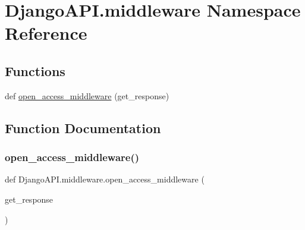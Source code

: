 \hypertarget{namespace_django_a_p_i_1_1middleware}{}\section{Django\+A\+P\+I.\+middleware Namespace Reference}
\label{namespace_django_a_p_i_1_1middleware}
\subsection*{Functions}
\begin{DoxyCompactItemize}
\item 
def \hyperlink{namespace_django_a_p_i_1_1middleware_a44c47dac28727c7fe143340eca4b4b85}{open\+\_\+access\+\_\+middleware} (get\+\_\+response)
\end{DoxyCompactItemize}


\subsection{Function Documentation}
\mbox{\label{namespace_django_a_p_i_1_1middleware_a44c47dac28727c7fe143340eca4b4b85}} 
\subsubsection{\texorpdfstring{open\+\_\+access\+\_\+middleware()}{open\_access\_middleware()}}
{\footnotesize\ttfamily def Django\+A\+P\+I.\+middleware.\+open\+\_\+access\+\_\+middleware (\begin{DoxyParamCaption}\item[{}]{get\+\_\+response }\end{DoxyParamCaption})}

